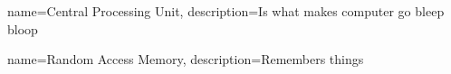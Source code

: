 \makeglossaries


{
	name={Central Processing Unit},
	description={Is what makes computer go bleep bloop}
}


{
	name={Random Access Memory},
	description={Remembers things}
}
